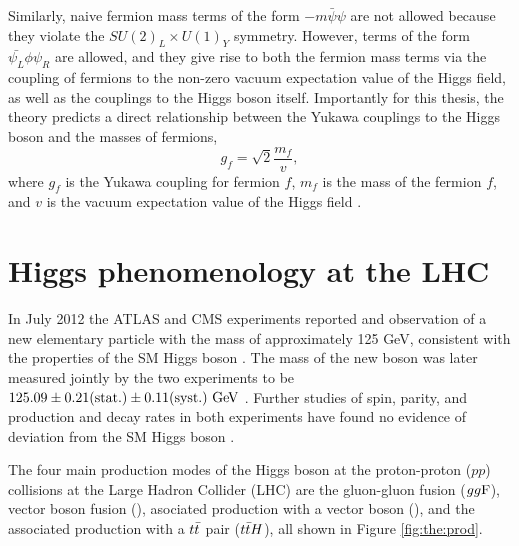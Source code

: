 Similarly, naive fermion mass terms of the form $-m \bar{\psi}\psi$ are not allowed because
they violate the $SU(2)_L \times U(1)_Y$ symmetry. However, terms of the form
$\bar{\psi_L}\phi\psi_R$ are allowed, and they give rise to both the fermion mass terms
via the coupling of fermions to the non-zero vacuum expectation value of the Higgs field,
as well as the couplings to the Higgs boson itself. Importantly for this thesis, the theory
predicts a direct relationship between the Yukawa couplings to the Higgs boson and the
masses of fermions,
\begin{equation}
g_f = \sqrt{2}\frac{m_f}{v},
\end{equation}
where $g_f$ is the Yukawa coupling for fermion $f$, $m_f$ is the mass of the fermion $f$,
and $v$ is the vacuum expectation value of the Higgs field \cite{Thomson:2013zua}.

\section{Higgs phenomenology at the LHC}

In July 2012 the ATLAS and CMS experiments reported and observation of a new elementary particle with the
mass of approximately 125 GeV, consistent with the properties of the SM Higgs boson
\cite{Aad:2012tfa, Chatrchyan:2012xdj}. The mass of the new boson was later measured
jointly by the two experiments to be $125.09 \pm 0.21 (\text{stat.}) \pm 0.11 (\text{syst.})~\text{Ge\kern -0.1em V}$
\cite{Aad:2015zhl}. Further studies of spin, parity, and production
and decay rates in both experiments have found no evidence of deviation from the SM
Higgs boson \cite{Aad:2015mxa, PhysRevD.92.012004, Khachatryan:2016vau, Aad:2019mbh}.

The four main production modes of the Higgs boson at the proton-proton ($pp$) collisions
at the Large Hadron Collider (LHC) are the gluon-gluon fusion ($gg\text{F}$), vector boson fusion
(\vbf), asociated production with a vector boson (\vh), and the associated production with
a $t\bar{t}$ pair ($t\bar{t} H$), all shown in Figure \ref{fig:the:prod}.

